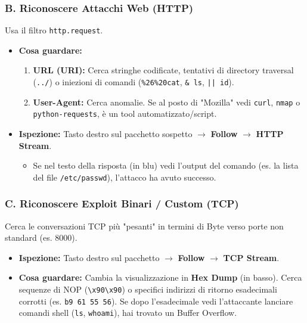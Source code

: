 \documentclass[12pt,a4paper]{report}
\begin{document}
	\subsubsection{B. Riconoscere Attacchi Web (HTTP)}
	Usa il filtro \texttt{http.request}.
	\begin{itemize}
		\item \textbf{Cosa guardare:}
		\begin{enumerate}
			\item \textbf{URL (URI):} Cerca stringhe codificate, tentativi di directory traversal (\texttt{../}) o iniezioni di comandi (\texttt{\%26\%20cat}, \texttt{\& ls}, \texttt{|| id}).
			\item \textbf{User-Agent:} Cerca anomalie. Se al posto di "Mozilla" vedi \texttt{curl}, \texttt{nmap} o \texttt{python-requests}, è un tool automatizzato/script.
		\end{enumerate}
		\item \textbf{Ispezione:} Tasto destro sul pacchetto sospetto $\rightarrow$ \textbf{Follow} $\rightarrow$ \textbf{HTTP Stream}. 
		\begin{itemize}
			\item Se nel testo della risposta (in blu) vedi l'output del comando (es. la lista del file \texttt{/etc/passwd}), l'attacco ha avuto successo.
		\end{itemize}
	\end{itemize}
	
	\subsubsection{C. Riconoscere Exploit Binari / Custom (TCP)}
	Cerca le conversazioni TCP più "pesanti" in termini di Byte verso porte non standard (es. 8000).
	\begin{itemize}
		\item \textbf{Ispezione:} Tasto destro sul pacchetto $\rightarrow$ \textbf{Follow} $\rightarrow$ \textbf{TCP Stream}.
		\item \textbf{Cosa guardare:} Cambia la visualizzazione in \textbf{Hex Dump} (in basso). Cerca sequenze di NOP (\texttt{\textbackslash x90\textbackslash x90}) o specifici indirizzi di ritorno esadecimali corrotti (es. \texttt{b9 61 55 56}). Se dopo l'esadecimale vedi l'attaccante lanciare comandi shell (\texttt{ls}, \texttt{whoami}), hai trovato un Buffer Overflow.
	\end{itemize}
	
\end{document}

